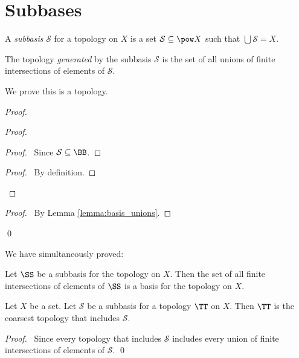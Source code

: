 \section{Subbases}

\begin{definition}[Subbasis]
    A \emph{subbasis} $\mathcal{S}$ for a topology on $X$ is a set $\mathcal{S} \subseteq \pow X$ such that
    $\bigcup \mathcal{S} = X$.

    The topology \emph{generated} by the subbasis $\mathcal{S}$ is the set of all unions of finite
    intersections of elements of $\mathcal{S}$.
\end{definition}

We prove this is a topology.

\begin{proof}
    \pf
    \begin{proof}
        \begin{proof}
            \pf\ Since $\mathcal{S} \subseteq \BB$.
        \end{proof}
        \begin{proof}
            \pf\ By definition.
        \end{proof}
    \end{proof}
    \qedstep
    \begin{proof}
        \pf\ By Lemma \ref{lemma:basis_unions}.
    \end{proof}
    \qed
\end{proof}

We have simultaneously proved:

\begin{proposition}
    \label{proposition:subbasis_basis}
    Let $\SS$ be a subbasis for the topology on $X$.
    Then the set of all finite intersections of elements of $\SS$
    is a basis for the topology on $X$.
\end{proposition}

\begin{proposition}
    \label{proposition:subbasis_coarsest}
    Let $X$ be a set. Let $\mathcal{S}$ be a subbasis for a topology $\TT$ on $X$. Then $\TT$ is the coarsest topology
    that includes $\mathcal{S}$.
\end{proposition}

\begin{proof}
    \pf\ Since every topology that includes $\mathcal{S}$ includes every union of finite intersections of
    elements of $\mathcal{S}$. \qed
\end{proof}

